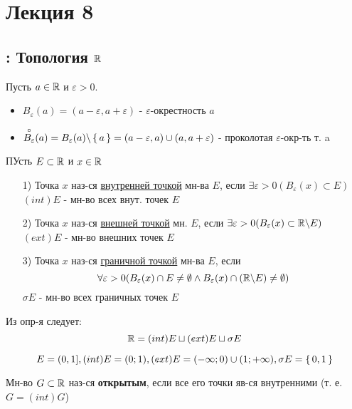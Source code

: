 \section{Лекция 8}

\subsection{: Топология $\mathbb{R}$}
Пусть $a \in \mathbb{R}$ и $\varepsilon > 0$.
\begin{symb}
  \begin{itemize}
    \item
$B_{\varepsilon}(a) = (a - \varepsilon, a + \varepsilon)$ - $\varepsilon$-окрестность $a$
  \item
    $\overset{\circ}{B_{\varepsilon}}(a) = B_{\varepsilon}(a) \backslash \set{a} = (a - \varepsilon, a) \cup (a, a + \varepsilon)$ - проколотая $\varepsilon$-окр-ть т. a
  \end{itemize}
\end{symb}
\begin{definition}
ПУсть $E \subset \mathbb{R}$ и $x \in \mathbb{R}$
\begin{itemize}
  \item [1) ] Точка $x$ наз-ся \underline{внутренней точкой} мн-ва $E$, если $\exists \varepsilon > 0 (B_{\varepsilon}(x) \subset E)$ \\

    $(int) E$ - мн-во всех внут. точек $E$
  \item [2) ] Точка $x$ наз-ся \underline{внешней точкой} мн. $E$, если $\exists \varepsilon > 0 (B_{\varepsilon}(x) \subset \mathbb{R} \backslash E)$
    $(ext) E$ - мн-во внешних точек $E$
  \item [3) ] Точка $x$ наз-ся \underline{граничной точкой} мн-ва $E$, если
    \[
      \forall \varepsilon > 0 (B_{\varepsilon}(x) \cap E \neq \emptyset \land B_{\varepsilon}(x) \cap (\mathbb{R} \backslash E) \neq \emptyset)
    \]
    $\sigma E$ - мн-во всех граничных точек $E$
\end{itemize}
\end{definition}
\begin{note}
Из опр-я следует:
\[
\mathbb{R} = (int) E \sqcup (ext) E \sqcup \sigma E
\]
\end{note}
\begin{example}
  \[
    E = (0, 1], (int) E = (0; 1), (ext) E = (-\infty; 0) \cup (1; +\infty), \sigma E = \set{0, 1}
  \]
\end{example}
\begin{definition}
Мн-во $G \subset \mathbb{R}$ наз-ся \textbf{открытым}, если все его точки яв-ся внутренними (т. е. $G = (int) G$)
\end{definition}
